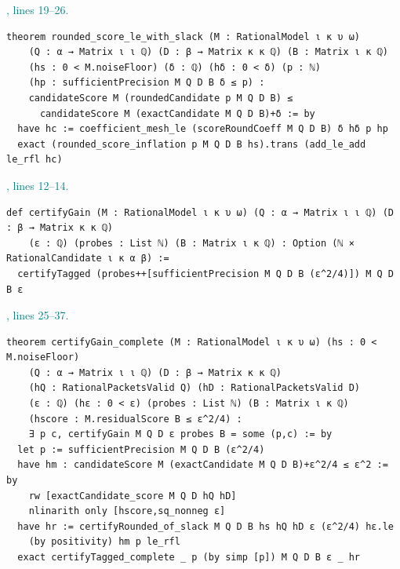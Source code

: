 \documentclass[11pt]{article}\usepackage{needspace}\renewcommand{\paperkind}{Lean companion}\setlength{\parskip}{0.35em}
\begin{document}
{\small\textcolor{teal}{, lines 19--26.}\par}

\begin{lstlisting}[style=BayesSource]
theorem rounded_score_le_with_slack (M : RationalModel ι κ υ ω)
    (Q : α → Matrix ι ι ℚ) (D : β → Matrix κ κ ℚ) (B : Matrix ι κ ℚ)
    (hs : 0 < M.noiseFloor) (δ : ℚ) (hδ : 0 < δ) (p : ℕ)
    (hp : sufficientPrecision M Q D B δ ≤ p) :
    candidateScore M (roundedCandidate p M Q D B) ≤
      candidateScore M (exactCandidate M Q D B)+δ := by
  have hc := coefficient_mesh_le (scoreRoundCoeff M Q D B) δ hδ p hp
  exact (rounded_score_inflation p M Q D B hs).trans (add_le_add le_rfl hc)
\end{lstlisting}



{\small\textcolor{teal}{, lines 12--14.}\par}

\begin{lstlisting}[style=BayesSource]
def certifyGain (M : RationalModel ι κ υ ω) (Q : α → Matrix ι ι ℚ) (D : β → Matrix κ κ ℚ)
    (ε : ℚ) (probes : List ℕ) (B : Matrix ι κ ℚ) : Option (ℕ × RationalCandidate ι κ α β) :=
  certifyTagged (probes++[sufficientPrecision M Q D B (ε^2/4)]) M Q D B ε
\end{lstlisting}



{\small\textcolor{teal}{, lines 25--37.}\par}

\begin{lstlisting}[style=BayesSource]
theorem certifyGain_complete (M : RationalModel ι κ υ ω) (hs : 0 < M.noiseFloor)
    (Q : α → Matrix ι ι ℚ) (D : β → Matrix κ κ ℚ)
    (hQ : RationalPacketsValid Q) (hD : RationalPacketsValid D)
    (ε : ℚ) (hε : 0 < ε) (probes : List ℕ) (B : Matrix ι κ ℚ)
    (hscore : M.residualScore B ≤ ε^2/4) :
    ∃ p c, certifyGain M Q D ε probes B = some (p,c) := by
  let p := sufficientPrecision M Q D B (ε^2/4)
  have hm : candidateScore M (exactCandidate M Q D B)+ε^2/4 ≤ ε^2 := by
    rw [exactCandidate_score M Q D hQ hD]
    nlinarith only [hscore,sq_nonneg ε]
  have hr := certifyRounded_of_slack M Q D B hs hQ hD ε (ε^2/4) hε.le
    (by positivity) hm p le_rfl
  exact certifyTagged_complete _ p (by simp [p]) M Q D B ε _ hr
\end{lstlisting}
\end{document}
